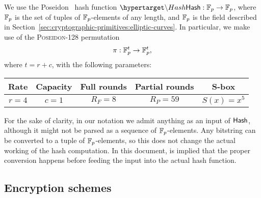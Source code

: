

We use the Poseidon~\cite{grassi21poseidon} hash function $ \hlset{\Hash} : \F_p \rightarrow \F_p$, where $\mathbb{F}_p$ is the set of tuples of $\mathbb{F}_p$-elements of any length, and $\mathbb{F}_p$ is the field described in Section~\ref{sec:cryptographic-primitives:elliptic-curves}. In particular, we make use of the \textsc{Poseidon-128} permutation \[\pi: \mathbb{F}_p^t\rightarrow \mathbb{F}_p^t,\] where $t=r+c$, with the following parameters:
\begin{table}[H]
	\begin{center}
		\begin{tabular}{| c | c | c | c | c | }
			\hline
			Rate & Capacity  & Full rounds & Partial rounds & S-box \\
			\hline
			$r=4$ & $c=1$ & $R_F=8$ & $R_P=59$ & $S(x)=x^5$ \\
			\hline		
		\end{tabular}
	\end{center}
\end{table}


For the sake of clarity, in our notation we admit anything as an input of ${\sf{Hash}}$, although it might not be parsed as a sequence of $\mathbb{F}_p$-elements. Any bitstring can be converted to a tuple of $\mathbb{F}_p$-elements, so this does not change the actual working of the hash computation. In this document, is implied that the proper conversion happens before feeding the input into the actual hash function.

\subsection{Encryption schemes}
\label{sec:cryptographic-primitives:encryption}

